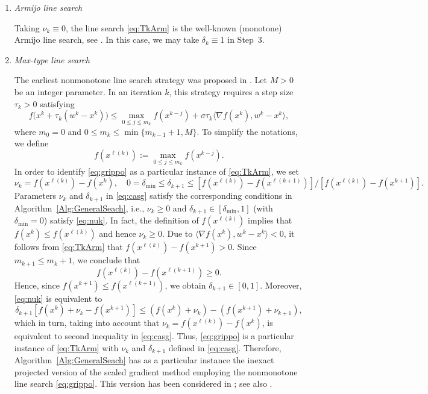 \begin{enumerate}
	\item {\it Armijo line search}

	      Taking  $\nu_k\equiv 0$, the line search   \eqref{eq:TkArm}  is the well-known (monotone) Armijo line search, see \cite[Section 2.3]{Bertsekas1999}. In this case, we  may take  $\delta_k\equiv 1$ in Step~3.

	\item {\it Max-type line search}

	      The earliest nonmonotone line search strategy  was proposed  in \cite{Grippo1986}. Let $M>0$ be an integer parameter. In an iteration $k$, this strategy requires a step size $\tau_k>0$ satisfying
	      \begin{equation}\label{eq:grippo}
		      f\big(x^{k}+ \tau_k(w^k - x^{k})\big) \leq \max_{0\leq j\leq m_k}f(x^{k-j}) + \sigma \tau_k\big\langle \nabla f(x^{k}), w^k - x^{k} \big\rangle,
	      \end{equation}
	      where $m_0=0$ and $0\leq m_k\leq \min\{m_{k-1}+1, M\}$.  To simplify the notations,  we define $$f(x^{\ell(k)}):=\max_{0\leq j\leq m_k}f(x^{k-j}).$$  In order to identify \eqref{eq:grippo} as a particular instance of \eqref{eq:TkArm}, we  set
	      \begin{equation} \label{eq:casg}
		      \nu_{k}= f(x^{\ell(k)})-f(x^k), \quad 0=\delta_{\min}\leq \delta_{k+1}\leq  [f(x^{\ell(k)})- f(x^{\ell(k+1)})]/[f(x^{\ell(k)})-f(x^{k+1})].
	      \end{equation}
	      Parameters $\nu_{k}$ and $\delta_{k+1}$ in \eqref{eq:casg} satisfy the corresponding conditions in Algorithm~\ref{Alg:GeneralSeach}, i.e.,  $\nu_{k} \geq 0$ and  $\delta_{k+1}\in [\delta_{\min}, 1]$ (with   $\delta_{\min}=0$)  satisfy \eqref{eq:nuk}.  In fact, the definition of $f(x^{\ell(k)})$ implies that   $ f(x^{k})\leq f(x^{\ell(k)})$ and hence $\nu_{k} \geq 0$.  Due to  $\langle \nabla f(x^{k}), w^k - x^{k} \rangle<0$,   it follows from  \eqref{eq:TkArm} that $f(x^{\ell(k)})-f(x^{k+1})>0$. Since   $m_{k+1}\leq m_{k}+1$, we conclude that  $$f(x^{\ell(k)})-f(x^{\ell(k+1)}) \geq 0.$$  
	      Hence, since $ f(x^{k+1})\leq f(x^{\ell(k+1)})$, we obtain $\delta_{k+1}\in [0, 1]$.  Moreover,  \eqref{eq:nuk} is equivalent  to
	      $$
		      \delta_{k+1}[f(x^{k})+\nu_{k}-f(x^{k+1})] \leq(f(x^{k})+\nu_{k}) -  (f(x^{k+1})+ \nu_{k+1}),
	      $$
	      which in turn, taking into account  that $\nu_{k}= f(x^{\ell(k)})-f(x^k)$, is equivalent to second inequality in \eqref{eq:casg}. Thus, \eqref{eq:grippo} is a particular instance of \eqref{eq:TkArm} with  $\nu_{k}$ and $\delta_{k+1}$ defined in \eqref{eq:casg}.  Therefore,  Algorithm~\ref{Alg:GeneralSeach} has as a particular instance the  inexact   projected  version of the scaled gradient method employing   the nonmonotone line search  \eqref{eq:grippo}. This version has been considered in \cite{BirginMartinezRaydan2003}; see also  \cite{Bonettini2009, WangLiu2005}.



\end{enumerate}
